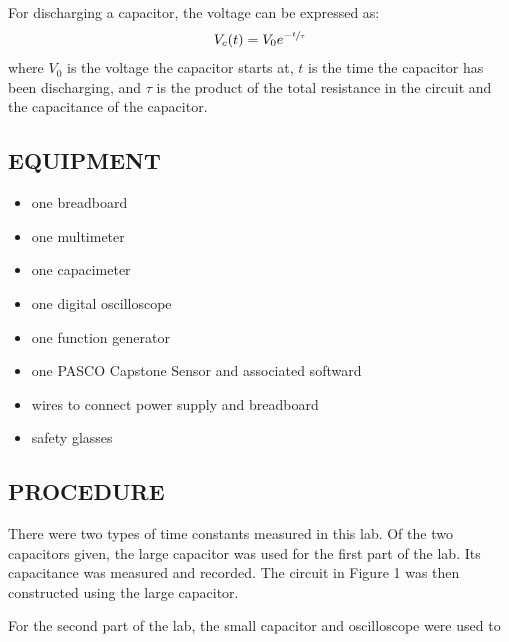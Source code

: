 \documentclass [12pt, letterpaper, twoside] {article}
\begin{document}
For discharging a capacitor, the voltage can be expressed as:
\begin{equation}
  \begin{split}
    V_{c}(t) &= V_{0}e^{-\sfrac{t}{\tau}} \\
  \end{split}
\end{equation}
where \(V_{0}\) is the voltage the capacitor starts at, \(t\) is the time the capacitor has been discharging, and \(\tau\) is the product of the total resistance in the circuit and the capacitance of the capacitor.

\subsection* {EQUIPMENT}
  \noindent
  \begin {itemize}
    \itemsep0em
    \item {one breadboard}
    \item {one multimeter}
    \item {one capacimeter}
    \item {one digital oscilloscope}
    \item {one function generator}
    \item {one PASCO Capstone Sensor and associated softward}
    \item {wires to connect power supply and breadboard}
    \item {safety glasses}
  \end {itemize}

\subsection* {PROCEDURE}
There were two types of time constants measured in this lab. Of the two capacitors given, the large capacitor was used for the first part of the lab. Its capacitance was measured and recorded. The circuit in Figure 1 was then constructed using the large capacitor.

\noindent
For the second part of the lab, the small capacitor and oscilloscope were used to 
\end{document}
